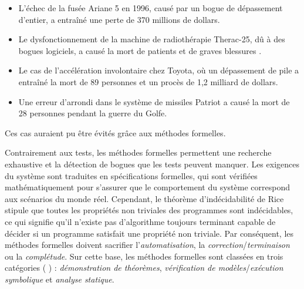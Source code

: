 {\begin{itemize}
\item L'échec de la fusée Ariane 5 en 1996, causé par un bogue de dépassement d'entier, a entraîné une perte de 370 millions de dollars.
\item Le dysfonctionnement de la machine de radiothérapie Therac-25, dû à des bogues logiciels, a causé la mort de patients et de graves blessures .
\item Le cas de l'accélération involontaire chez Toyota, où un dépassement de pile a entraîné la mort de 89 personnes et un procès de 1,2 milliard de dollars.
\item Une erreur d'arrondi dans le système de missiles Patriot a causé la mort de 28 personnes pendant la guerre du Golfe.
\end{itemize}

Ces cas auraient pu être évités grâce aux méthodes formelles.

Contrairement aux tests, les méthodes formelles permettent une recherche exhaustive et la détection de bogues que les tests peuvent manquer. Les exigences du système sont traduites en spécifications formelles, qui sont vérifiées mathématiquement pour s'assurer que le comportement du système correspond aux scénarios du monde réel. Cependant, le théorème d'indécidabilité de Rice  stipule que toutes les propriétés non triviales des programmes sont indécidables, ce qui signifie qu'il n'existe pas d'algorithme toujours terminant capable de décider si un programme satisfait une propriété non triviale. Par conséquent, les méthodes formelles doivent sacrifier l'\emph{automatisation}, la \emph{correction}/\emph{terminaison} ou la \emph{complétude}. Sur cette base, les méthodes formelles sont classées en trois catégories  (\cf{} ) : \emph{démonstration de théorèmes}, \emph{vérification de modèles}/\emph{exécution symbolique} et \emph{analyse statique}.
}

